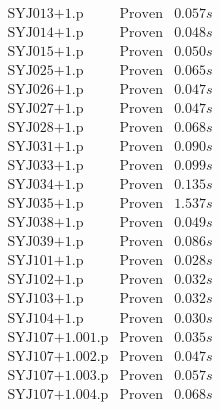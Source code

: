 \documentclass[a4paper,11pt]{report}
\theoremstyle{definition}
\theoremstyle{definition}
\theoremstyle{definition}
\theoremstyle{definition}
\theoremstyle{definition}
\theoremstyle{definition}
\theoremstyle{definition}
\begin{document}
\begin{minipage}{0.45\textwidth}
\[\begin{matrix}
			\text{SYJ013+1.p}&\text{Proven}& 0.057 s\\
			\text{SYJ014+1.p}&\text{Proven}& 0.048 s\\
			\text{SYJ015+1.p}&\text{Proven}& 0.050 s\\
			\text{SYJ025+1.p}&\text{Proven}& 0.065 s\\
			\text{SYJ026+1.p}&\text{Proven}& 0.047 s\\
			\text{SYJ027+1.p}&\text{Proven}& 0.047 s\\
			\text{SYJ028+1.p}&\text{Proven}& 0.068 s\\
			\text{SYJ031+1.p}&\text{Proven}& 0.090 s\\
			\text{SYJ033+1.p}&\text{Proven}& 0.099 s\\
			\text{SYJ034+1.p}&\text{Proven}& 0.135 s\\
			\text{SYJ035+1.p}&\text{Proven}& 1.537 s\\
			\text{SYJ038+1.p}&\text{Proven}& 0.049 s\\
			\text{SYJ039+1.p}&\text{Proven}& 0.086 s\\
			\text{SYJ101+1.p}&\text{Proven}& 0.028 s\\
			\text{SYJ102+1.p}&\text{Proven}& 0.032 s\\
			\text{SYJ103+1.p}&\text{Proven}& 0.032 s\\
			\text{SYJ104+1.p}&\text{Proven}& 0.030 s\\
			\text{SYJ107+1.001.p}&\text{Proven}& 0.035 s\\
			\text{SYJ107+1.002.p}&\text{Proven}& 0.047 s\\
			\text{SYJ107+1.003.p}&\text{Proven}& 0.057 s\\
			\text{SYJ107+1.004.p}&\text{Proven}& 0.068 s\\
		\end{matrix}\]
	\end{minipage}
	
	\pagebreak
	
\end{document}
